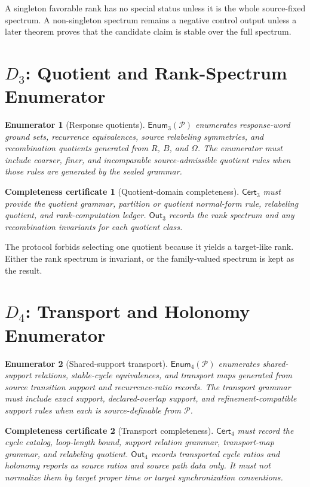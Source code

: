 \documentclass[11pt]{article}
\newcommand{\Pack}{\mathcal{P}}
\newcommand{\Enum}{\mathsf{Enum}}
\newcommand{\Cert}{\mathsf{Cert}}
\newcommand{\Out}{\mathsf{Out}}
\newtheorem{enumerator}{Enumerator}
\newtheorem{certificate}{Completeness certificate}
\begin{document}
A singleton favorable rank has no special status unless it is the whole
source-fixed spectrum. A non-singleton spectrum remains a negative control
output unless a later theorem proves that the candidate claim is stable over
the full spectrum.

\section{\texorpdfstring{\(D_3\)}{D3}: Quotient and Rank-Spectrum Enumerator}

\begin{enumerator}[Response quotients]
\(\Enum_3(\Pack)\) enumerates response-word ground sets, recurrence
equivalences, source relabeling symmetries, and recombination quotients
generated from \(R\), \(B\), and \(\Omega\). The enumerator must include
coarser, finer, and incomparable source-admissible quotient rules when those
rules are generated by the sealed grammar.
\end{enumerator}

\begin{certificate}[Quotient-domain completeness]
\(\Cert_3\) must provide the quotient grammar, partition or quotient
normal-form rule, relabeling quotient, and rank-computation ledger.
\(\Out_3\) records the rank spectrum and any recombination invariants for
each quotient class.
\end{certificate}

The protocol forbids selecting one quotient because it yields a target-like
rank. Either the rank spectrum is invariant, or the family-valued spectrum is
kept as the result.

\section{\texorpdfstring{\(D_4\)}{D4}: Transport and Holonomy Enumerator}

\begin{enumerator}[Shared-support transport]
\(\Enum_4(\Pack)\) enumerates shared-support relations, stable-cycle
equivalences, and transport maps generated from source transition support
and recurrence-ratio records. The transport grammar must include exact
support, declared-overlap support, and refinement-compatible support rules
when each is source-definable from \(\Pack\).
\end{enumerator}

\begin{certificate}[Transport completeness]
\(\Cert_4\) must record the cycle catalog, loop-length bound, support
relation grammar, transport-map grammar, and relabeling quotient. \(\Out_4\)
records transported cycle ratios and holonomy reports as source ratios and
source path data only. It must not normalize them by target proper time or
target synchronization conventions.
\end{certificate}
\end{document}
